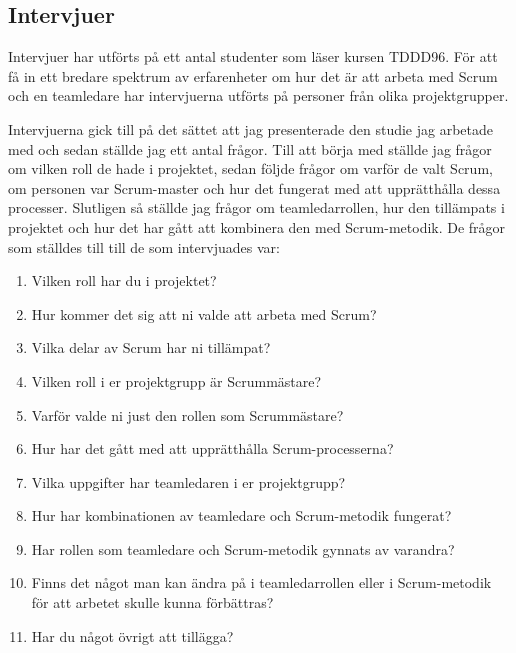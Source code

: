\subsection{Intervjuer}
Intervjuer har utförts på ett antal studenter som läser kursen TDDD96. För att få in ett bredare spektrum av erfarenheter om hur det är att arbeta med Scrum och en teamledare har intervjuerna utförts på personer från olika projektgrupper.

Intervjuerna gick till på det sättet att jag presenterade den studie jag arbetade med och sedan ställde jag ett antal frågor. Till att börja med ställde jag frågor om vilken roll de hade i projektet, sedan följde frågor om varför de valt Scrum, om personen var Scrum-master och hur det fungerat med att upprätthålla dessa processer. Slutligen så ställde jag frågor om teamledarrollen, hur den tillämpats i projektet och hur det har gått att kombinera den med Scrum-metodik. De frågor som ställdes till till de som intervjuades var:

\begin{enumerate}

\item Vilken roll har du i projektet?

\item Hur kommer det sig att ni valde att arbeta med Scrum?

\item Vilka delar av Scrum har ni tillämpat?

\item Vilken roll i er projektgrupp är Scrummästare?

\item Varför valde ni just den rollen som Scrummästare?

\item Hur har det gått med att upprätthålla Scrum-processerna?

\item Vilka uppgifter har teamledaren i er projektgrupp?

\item Hur har kombinationen av teamledare och Scrum-metodik fungerat?

\item Har rollen som teamledare och Scrum-metodik gynnats av varandra?

\item Finns det något man kan ändra på i teamledarrollen eller i Scrum-metodik för att arbetet skulle kunna förbättras?

\item Har du något övrigt att tillägga?

\end{enumerate}

